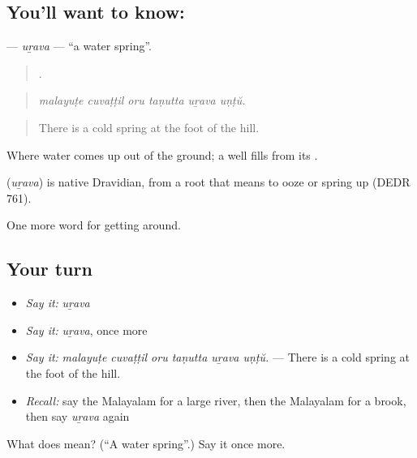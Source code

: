 \subsection*{You'll want to know: }
\textbf{} — \emph{uṟava} — \textquotedblleft{}a water spring\textquotedblright{}.

\begin{quote}
     .
\end{quote}

\begin{quote}
\emph{malayuṭe cuvaṭṭil oru taṇutta uṟava uṇṭŭ.}
\end{quote}

\begin{quote}
There is a cold spring at the foot of the hill.
\end{quote}

Where water comes up out of the ground; a well fills from its .

\begin{cousinweb}
\textbf{} (\emph{uṟava}) is native Dravidian, from a root that means to ooze or spring up (DEDR 761).
\end{cousinweb}

\begin{grammarlens}[title={What you've built}]
One more word for getting around.
\end{grammarlens}

\subsection*{Your turn}
\begin{itemize}
\raggedright
  \item \emph{Say it:} \emph{uṟava}
  \item \emph{Say it:} \emph{uṟava}, once more
  \item \emph{Say it:} \emph{malayuṭe cuvaṭṭil oru taṇutta uṟava uṇṭŭ.} — There is a cold spring at the foot of the hill.
  \item \emph{Recall:} say the Malayalam for a large river, then the Malayalam for a brook, then say \emph{uṟava} again
\end{itemize}

\begin{tcolorbox}[breakable,colback=teal!4,colframe=teal!35!black,title={Before you move on}]
What does  mean? (\textquotedblleft{}A water spring\textquotedblright{}.) Say it once more.
\end{tcolorbox}
